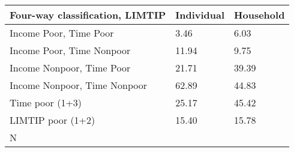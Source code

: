 \begin{table}[!ht]
    \centering
    \begin{tabular}{lll}
    \hline
        Four-way classification, LIMTIP & Individual & Household \\ \hline
        Income Poor, Time Poor & 3.46 & 6.03  \\ 
        Income Poor, Time Nonpoor & 11.94 & 9.75  \\ 
        Income Nonpoor, Time Poor & 21.71 & 39.39  \\ 
        Income Nonpoor, Time Nonpoor & 62.89 & 44.83  \\ \hline
        Time poor (1+3) & 25.17 & 45.42  \\ \hline
        LIMTIP poor (1+2) & 15.40 & 15.78  \\ \hline
        N & ~ & ~ \\ \hline
    \end{tabular}
\end{table}